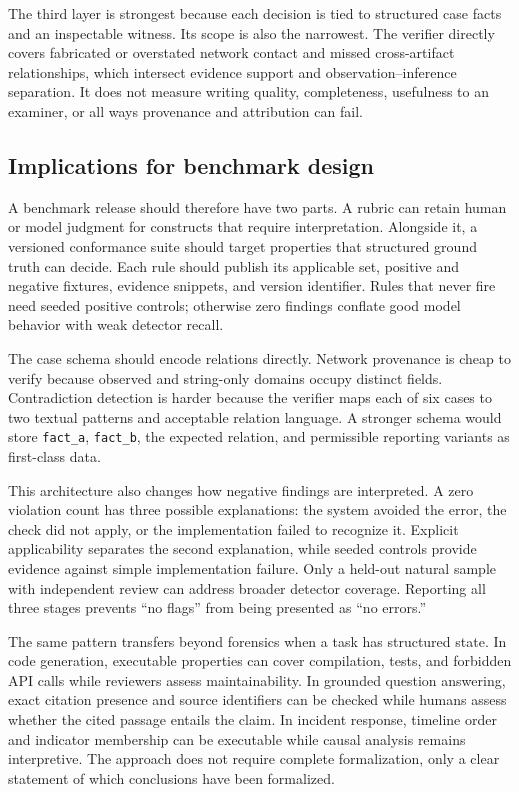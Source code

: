 \documentclass[conference]{IEEEtran}
\begin{document}
The third layer is strongest because each decision is tied to structured case
facts and an inspectable witness. Its scope is also the narrowest. The verifier
directly covers fabricated or overstated network contact and missed
cross-artifact relationships, which intersect evidence support and
observation--inference separation. It does not measure writing quality,
completeness, usefulness to an examiner, or all ways provenance and attribution
can fail.

\subsection{Implications for benchmark design}\label{sec:design}
A benchmark release should therefore have two parts. A rubric can retain human
or model judgment for constructs that require interpretation. Alongside it, a
versioned conformance suite should target properties that structured ground
truth can decide. Each rule should publish its applicable set, positive and
negative fixtures, evidence snippets, and version identifier. Rules that never
fire need seeded positive controls; otherwise zero findings conflate good model
behavior with weak detector recall.

The case schema should encode relations directly. Network provenance is cheap
to verify because observed and string-only domains occupy distinct fields.
Contradiction detection is harder because the verifier maps each of six cases
to two textual patterns and acceptable relation language. A stronger schema
would store \texttt{fact\_a}, \texttt{fact\_b}, the expected relation, and
permissible reporting variants as first-class data.

This architecture also changes how negative findings are interpreted. A zero
violation count has three possible explanations: the system avoided the error,
the check did not apply, or the implementation failed to recognize it. Explicit
applicability separates the second explanation, while seeded controls provide
evidence against simple implementation failure. Only a held-out natural sample
with independent review can address broader detector coverage. Reporting all
three stages prevents ``no flags'' from being presented as ``no errors.''

The same pattern transfers beyond forensics when a task has structured state.
In code generation, executable properties can cover compilation, tests, and
forbidden API calls while reviewers assess maintainability. In grounded question
answering, exact citation presence and source identifiers can be checked while
humans assess whether the cited passage entails the claim. In incident response,
timeline order and indicator membership can be executable while causal analysis
remains interpretive. The approach does not require complete formalization,
only a clear statement of which conclusions have been formalized.
\end{document}

